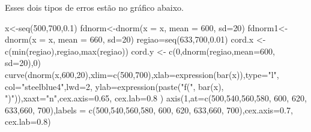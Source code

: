 \documentclass[
  letterpaper,
  DIV=11,
  numbers=noendperiod]{scrartcl}
\newenvironment{Shaded}{\begin{snugshade}}{\end{snugshade}}
\newcommand{\AttributeTok}[1]{\textcolor[rgb]{0.40,0.45,0.13}{#1}}
\newcommand{\DecValTok}[1]{\textcolor[rgb]{0.68,0.00,0.00}{#1}}
\newcommand{\FloatTok}[1]{\textcolor[rgb]{0.68,0.00,0.00}{#1}}
\newcommand{\FunctionTok}[1]{\textcolor[rgb]{0.28,0.35,0.67}{#1}}
\newcommand{\NormalTok}[1]{\textcolor[rgb]{0.00,0.23,0.31}{#1}}
\newcommand{\OtherTok}[1]{\textcolor[rgb]{0.00,0.23,0.31}{#1}}
\newcommand{\StringTok}[1]{\textcolor[rgb]{0.13,0.47,0.30}{#1}}
\begin{document}
Esses dois tipos de erros estão no gráfico abaixo.

\begin{Shaded}
\begin{Highlighting}[]
\NormalTok{x}\OtherTok{\textless{}{-}}\FunctionTok{seq}\NormalTok{(}\DecValTok{500}\NormalTok{,}\DecValTok{700}\NormalTok{,}\FloatTok{0.1}\NormalTok{) }
\NormalTok{fdnorm}\OtherTok{\textless{}{-}}\FunctionTok{dnorm}\NormalTok{(}\AttributeTok{x =}\NormalTok{ x, }\AttributeTok{mean =} \DecValTok{600}\NormalTok{, }\AttributeTok{sd=}\DecValTok{20}\NormalTok{)  }
\NormalTok{fdnorm1}\OtherTok{\textless{}{-}}\FunctionTok{dnorm}\NormalTok{(}\AttributeTok{x =}\NormalTok{ x, }\AttributeTok{mean =} \DecValTok{660}\NormalTok{, }\AttributeTok{sd=}\DecValTok{20}\NormalTok{)}
\NormalTok{regiao}\OtherTok{=}\FunctionTok{seq}\NormalTok{(}\DecValTok{633}\NormalTok{,}\DecValTok{700}\NormalTok{,}\FloatTok{0.01}\NormalTok{)}
\NormalTok{cord.x }\OtherTok{\textless{}{-}} \FunctionTok{c}\NormalTok{(}\FunctionTok{min}\NormalTok{(regiao),regiao,}\FunctionTok{max}\NormalTok{(regiao))}
\NormalTok{cord.y }\OtherTok{\textless{}{-}} \FunctionTok{c}\NormalTok{(}\DecValTok{0}\NormalTok{,}\FunctionTok{dnorm}\NormalTok{(regiao,}\AttributeTok{mean=}\DecValTok{600}\NormalTok{, }\AttributeTok{sd=}\DecValTok{20}\NormalTok{),}\DecValTok{0}\NormalTok{) }
\FunctionTok{curve}\NormalTok{(}\FunctionTok{dnorm}\NormalTok{(x,}\DecValTok{600}\NormalTok{,}\DecValTok{20}\NormalTok{),}\AttributeTok{xlim=}\FunctionTok{c}\NormalTok{(}\DecValTok{500}\NormalTok{,}\DecValTok{700}\NormalTok{),}\AttributeTok{xlab=}\FunctionTok{expression}\NormalTok{(}\FunctionTok{bar}\NormalTok{(x)),}\AttributeTok{type=}\StringTok{"l"}\NormalTok{,}
      \AttributeTok{col=}\StringTok{"steelblue4"}\NormalTok{,}\AttributeTok{lwd=}\DecValTok{2}\NormalTok{, }\AttributeTok{ylab=}\FunctionTok{expression}\NormalTok{(}\FunctionTok{paste}\NormalTok{(}\StringTok{"f("}\NormalTok{, }\FunctionTok{bar}\NormalTok{(x),}
      \StringTok{")"}\NormalTok{)),}\AttributeTok{xaxt=}\StringTok{"n"}\NormalTok{,}\AttributeTok{cex.axis=}\FloatTok{0.65}\NormalTok{, }\AttributeTok{cex.lab=}\FloatTok{0.8}\NormalTok{ ) }
\FunctionTok{axis}\NormalTok{(}\DecValTok{1}\NormalTok{,}\AttributeTok{at=}\FunctionTok{c}\NormalTok{(}\DecValTok{500}\NormalTok{,}\DecValTok{540}\NormalTok{,}\DecValTok{560}\NormalTok{,}\DecValTok{580}\NormalTok{, }\DecValTok{600}\NormalTok{, }\DecValTok{620}\NormalTok{, }\DecValTok{633}\NormalTok{,}\DecValTok{660}\NormalTok{, }\DecValTok{700}\NormalTok{),}\AttributeTok{labels =}
       \FunctionTok{c}\NormalTok{(}\DecValTok{500}\NormalTok{,}\DecValTok{540}\NormalTok{,}\DecValTok{560}\NormalTok{,}\DecValTok{580}\NormalTok{, }\DecValTok{600}\NormalTok{, }\DecValTok{620}\NormalTok{, }\DecValTok{633}\NormalTok{,}\DecValTok{660}\NormalTok{, }\DecValTok{700}\NormalTok{),}\AttributeTok{cex.axis=}\FloatTok{0.7}\NormalTok{, }\AttributeTok{cex.lab=}\FloatTok{0.8}\NormalTok{) }

\end{Highlighting}
\end{Shaded}
\end{document}
